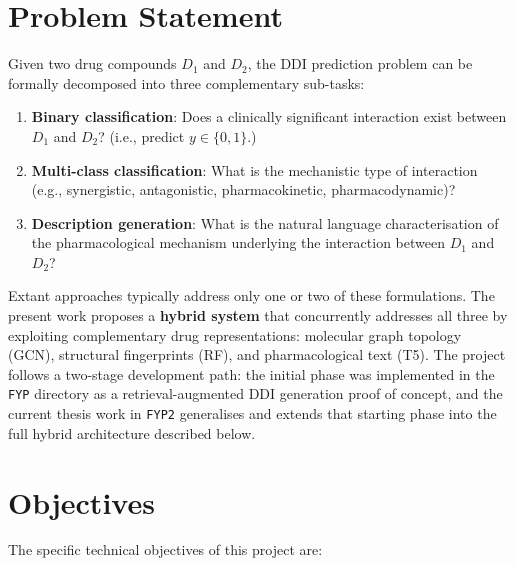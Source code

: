 \documentclass[12pt,a4paper,oneside]{report}
\begin{document}
\section{Problem Statement}

Given two drug compounds $D_1$ and $D_2$, the DDI prediction problem can be formally
decomposed into three complementary sub-tasks:

\begin{enumerate}
  \item \textbf{Binary classification}: Does a clinically significant interaction exist
  between $D_1$ and $D_2$? (i.e., predict $y \in \{0, 1\}$.)
  \item \textbf{Multi-class classification}: What is the mechanistic type of interaction
  (e.g., synergistic, antagonistic, pharmacokinetic, pharmacodynamic)?
  \item \textbf{Description generation}: What is the natural language characterisation of
  the pharmacological mechanism underlying the interaction between $D_1$ and $D_2$?
\end{enumerate}

Extant approaches typically address only one or two of these formulations. The present work
proposes a \textbf{hybrid system} that concurrently addresses all three by exploiting
complementary drug representations: molecular graph topology (GCN), structural fingerprints
(RF), and pharmacological text (T5). The project follows a two-stage development path: the
initial phase was implemented in the \texttt{FYP} directory as a retrieval-augmented DDI
generation proof of concept, and the current thesis work in \texttt{FYP2} generalises and
extends that starting phase into the full hybrid architecture described below.

\section{Objectives}

The specific technical objectives of this project are:
\end{document}
